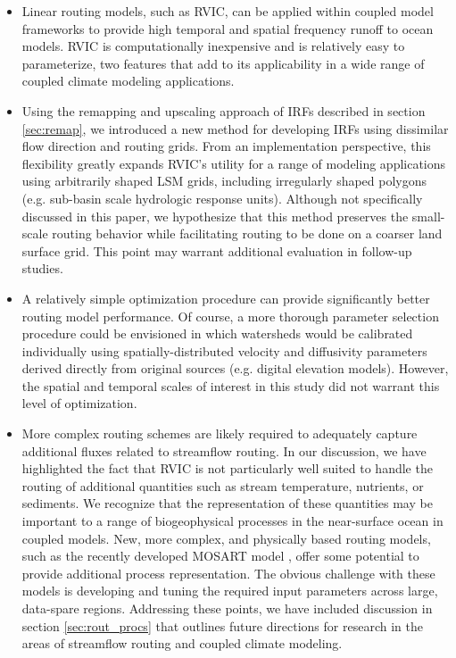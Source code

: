 \documentclass[jgrga, draft]{agutex}
\begin{document}
\begin{article}
\begin{itemize}[leftmargin=+.5in]
  \item Linear routing models, such as RVIC, can be applied within coupled model frameworks to provide high temporal and spatial frequency runoff to ocean models.
  RVIC is computationally inexpensive and is relatively easy to parameterize, two features that add to its applicability in a wide range of coupled climate modeling applications.
  \item Using the remapping and upscaling approach of IRFs described in section \ref{sec:remap}, we introduced a new method for developing IRFs using dissimilar flow direction and routing grids.
  From an implementation perspective, this flexibility greatly expands RVIC's utility for a range of modeling applications using arbitrarily shaped LSM grids, including irregularly shaped polygons (e.g. sub-basin scale hydrologic response units).
  Although not specifically discussed in this paper, we hypothesize that this method preserves the small-scale routing behavior while facilitating routing to be done on a coarser land surface grid.
  This point may warrant additional evaluation in follow-up studies.
  \item A relatively simple optimization procedure can provide significantly better routing model performance.
  Of course, a more thorough parameter selection procedure could be envisioned in which watersheds would be calibrated individually using spatially-distributed velocity and diffusivity parameters derived directly from original sources (e.g. digital elevation models).
  However, the spatial and temporal scales of interest in this study did not warrant this level of optimization.
  \item More complex routing schemes are likely required to adequately capture additional fluxes related to streamflow routing.
  In our discussion, we have highlighted the fact that RVIC is not particularly well suited to handle the routing of additional quantities such as stream temperature, nutrients, or sediments.
  We recognize that the representation of these quantities may be important to a range of biogeophysical processes in the near-surface ocean in coupled models.
  New, more complex, and physically based routing models, such as the recently developed MOSART model \citep{Li_2013}, offer some potential to provide additional process representation.
  The obvious challenge with these models is developing and tuning the required input parameters across large, data-spare regions.
  Addressing these points, we have included discussion in section \ref{sec:rout_procs} that outlines future directions for research in the areas of streamflow routing and coupled climate modeling.

\end{itemize}
\end{article}
\end{document}

